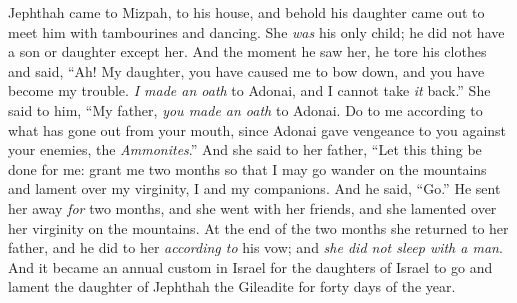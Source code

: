\begin{biblechapter}
\verse Jephthah came to Mizpah, to his house, and behold his daughter came out to meet him with tambourines and dancing. She \textit{was} his only child; he did not have a son or daughter except her.
\verse And the moment he saw her, he tore his clothes and said, “Ah! My daughter, you have caused me to bow down, and you have become my trouble. \textit{I made an oath} to Adonai, and I cannot take \textit{it} back.”
\verse She said to him, “My father, \textit{you made an oath} to Adonai. Do to me according to what has gone out from your mouth, since Adonai gave vengeance to you against your enemies, the \textit{Ammonites}.”
\verse And she said to her father, “Let this thing be done for me: grant me two months so that I may go wander on the mountains and lament over my virginity, I and my companions.
\verse And he said, “Go.” He sent her away \textit{for} two months, and she went with her friends, and she lamented over her virginity on the mountains.
\verse At the end of the two months she returned to her father, and he did to her \textit{according to} his vow; and \textit{she did not sleep with a man}. And it became an annual custom in Israel
\verse for the daughters of Israel to go and lament the daughter of Jephthah the Gileadite for forty days of the year.
\end{biblechapter}

